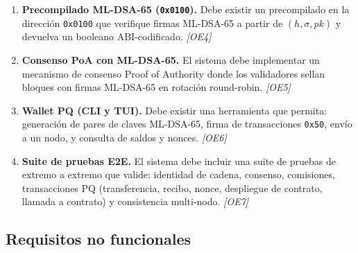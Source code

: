\begin{enumerate}[label=\textbf{RF\arabic{enumi}:}, leftmargin=3em, labelsep=0.5em]
  \item \textbf{Precompilado ML-DSA-65 (\texttt{0x0100}).} Debe existir un precompilado en la dirección \texttt{0x0100} que verifique firmas ML-DSA-65 a partir de $(h, \sigma, \mathit{pk})$ y devuelva un booleano ABI-codificado. \hfill \emph{[OE4]}
  
  \item \textbf{Consenso PoA con ML-DSA-65.} El sistema debe implementar un mecanismo de consenso Proof of Authority donde los validadores sellan bloques con firmas ML-DSA-65 en rotación round-robin. \hfill \emph{[OE5]}
  
  \item \textbf{Wallet PQ (CLI y TUI).} Debe existir una herramienta que permita: generación de pares de claves ML-DSA-65, firma de transacciones \texttt{0x50}, envío a un nodo, y consulta de saldos y nonces. \hfill \emph{[OE6]}
  
  \item \textbf{Suite de pruebas E2E.} El sistema debe incluir una suite de pruebas de extremo a extremo que valide: identidad de cadena, consenso, comisiones, transacciones PQ (transferencia, recibo, nonce, despliegue de contrato, llamada a contrato) y consistencia multi-nodo. \hfill \emph{[OE7]}
\end{enumerate}

\subsection{Requisitos no funcionales}

